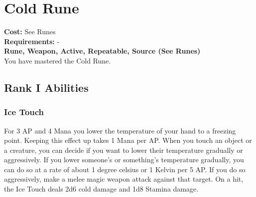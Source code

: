 \section{Cold Rune}\label{rune:cold}
\textbf{Cost:} See Runes\\
\textbf{Requirements:} -\\
\textbf{Rune, Weapon, Active, Repeatable, Source (See Runes)}\\
You have mastered the Cold Rune.

\subsection{Rank I Abilities}

\subsubsection{Ice Touch}
For 3 AP and 4 Mana you lower the temperature of your hand to a freezing point.
Keeping this effect up takes 1 Mana per AP.
When you touch an object or a creature, you can decide if you want to lower their temperature gradually or aggressively.
If you lower someone's or something's temperature gradually, you can do so at a rate of about 1 degree celsius or 1 Kelvin per 5 AP.
If you do so aggressively, make a melee magic weapon attack against that target.
On a hit, the Ice Touch deals 2d6 cold damage and 1d8 Stamina damage.